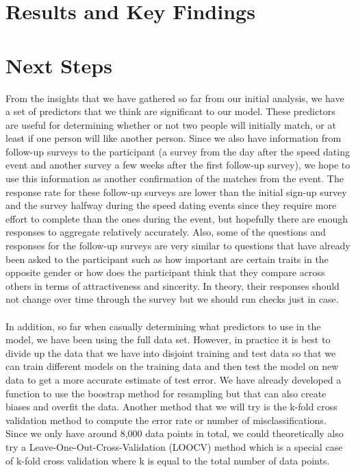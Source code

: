 \documentclass{article}
\begin{document}
\section{Results and Key Findings}

\section{Next Steps}
From the insights that we have gathered so far from our initial analysis, we have a set of predictors that we think are significant to our model.  These predictors are useful for determining whether or not two people will initially match, or at least if one person will like another person.  Since we also have information from follow-up surveys to the participant (a survey from the day after the speed dating event and another survey a few weeks after the first follow-up survey), we hope to use this information as another confirmation of the matches from the event.  The response rate for these follow-up surveys are lower than the initial sign-up survey and the survey halfway during the speed dating events since they require more effort to complete than the ones during the event, but hopefully there are enough responses to aggregate relatively accurately.  Also, some of the questions and responses for the follow-up surveys are very similar to questions that have already been asked to the participant such as how important are certain traits in the opposite gender or how does the participant think that they compare across others in terms of attractiveness and sincerity.  In theory, their responses should not change over time through the survey but we should run checks just in case.\\
\null\\
In addition, so far when casually determining what predictors to use in the model, we have been using the full data set.  However, in practice it is best to divide up the data that we have into disjoint training and test data so that we can train different models on the training data and then test the model on new data to get a more accurate estimate of test error.  We have already developed a function to use the boostrap method for resampling but that can also create biases and overfit the data.  Another method that we will try is the k-fold cross validation method to compute the error rate or number of misclassifications.  Since we only have around 8,000 data points in total, we could theoretically also try a Leave-One-Out-Cross-Validation (LOOCV) method which is a special case of k-fold cross validation where k is equal to the total number of data points.\\
\end{document}
